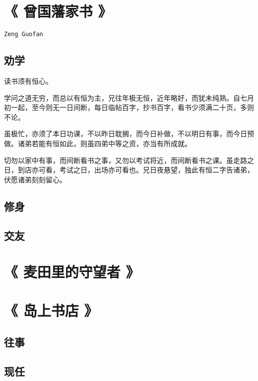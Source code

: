 \documentclass[UTF8,a4paper,8pt]{ctexart}
\begin{document}
	\section{《 曾国藩家书 》   }	
		\verb|Zeng Guofan |
		\subsection{劝学}
			读书须有恒心。
			
			学问之道无穷，而总以有恒为主，兄往年极无恒，近年略好，而犹未纯熟。自七月初一起，至今则无一日间断，每日临帖百字，抄书百字，看书少须满二十页，多则不论。
			
			虽极忙，亦须了本日功课，不以昨日耽搁，而今日补做，不以明日有事，而今日预做。诸弟若能有恒如此，则虽四弟中等之资，亦当有所成就。
			
			切勿以家中有事，而间断看书之事，又勿以考试将近，而间断看书之课。虽走路之日，到店亦可看，考试之日，出场亦可看也。兄日夜悬望，独此有恒二字告诸弟，伏愿诸弟刻刻留心。
			
			
		\subsection{修身}
		\subsection{交友}

	\section{《 麦田里的守望者 》   }	
	
	
	\section{《 岛上书店 》   }	
		\subsection{往事}
			
		\subsection{现任}
		
		
\end{document}
